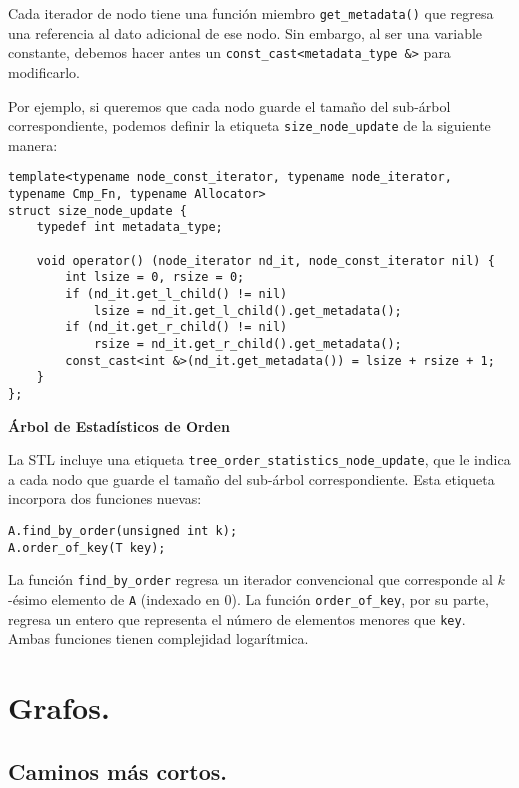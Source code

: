 \documentclass[10pt, letterpaper, twoside]{article}
\begin{document}
Cada iterador de nodo tiene una función miembro \texttt{get\_metadata()} que regresa una referencia al dato adicional de ese nodo. Sin embargo, al ser una variable constante, debemos hacer antes un \texttt{const\_cast<metadata\_type \&>} para modificarlo.

Por ejemplo, si queremos que cada nodo guarde el tamaño del sub-árbol correspondiente, podemos definir la etiqueta \texttt{size\_node\_update} de la siguiente manera:

\begin{lstlisting}
template<typename node_const_iterator, typename node_iterator, typename Cmp_Fn, typename Allocator>
struct size_node_update {
    typedef int metadata_type;

    void operator() (node_iterator nd_it, node_const_iterator nil) {
        int lsize = 0, rsize = 0;
        if (nd_it.get_l_child() != nil)
            lsize = nd_it.get_l_child().get_metadata();
        if (nd_it.get_r_child() != nil)
            rsize = nd_it.get_r_child().get_metadata();
        const_cast<int &>(nd_it.get_metadata()) = lsize + rsize + 1;
    }
};
\end{lstlisting}

\textbf{Árbol de Estadísticos de Orden}

La STL incluye una etiqueta \texttt{tree\_order\_statistics\_node\_update}, que le indica a cada nodo que guarde el tamaño del sub-árbol correspondiente. Esta etiqueta incorpora dos funciones nuevas:
\begin{lstlisting}
A.find_by_order(unsigned int k);
A.order_of_key(T key);
\end{lstlisting}
La función \texttt{find\_by\_order} regresa un iterador convencional que corresponde al $k$-ésimo elemento de \texttt{A} (indexado en 0). La función \texttt{order\_of\_key}, por su parte, regresa un entero que representa el número de elementos menores que \texttt{key}. Ambas funciones tienen complejidad logarítmica.

 \medskip


\section{Grafos.}

\subsection{Caminos más cortos.}
\end{document}
